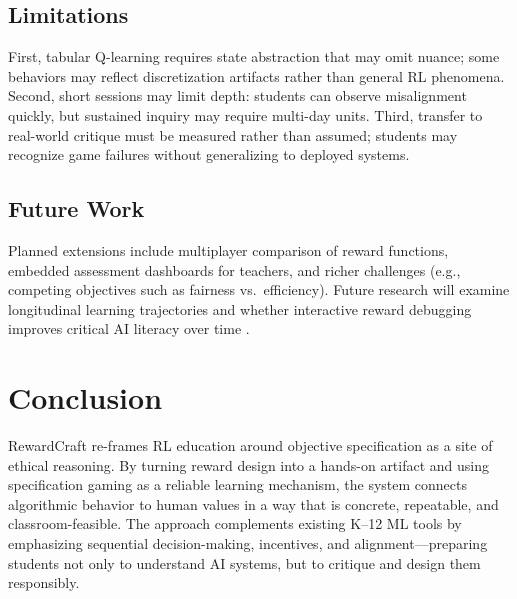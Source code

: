 \documentclass[conference]{IEEEtran}
\begin{document}
\subsection{Limitations}
First, tabular Q-learning requires state abstraction that may omit nuance; some behaviors may reflect discretization artifacts rather than general RL phenomena. Second, short sessions may limit depth: students can observe misalignment quickly, but sustained inquiry may require multi-day units. Third, transfer to real-world critique must be measured rather than assumed; students may recognize game failures without generalizing to deployed systems.

\subsection{Future Work}
Planned extensions include multiplayer comparison of reward functions, embedded assessment dashboards for teachers, and richer challenges (e.g., competing objectives such as fairness vs.\ efficiency). Future research will examine longitudinal learning trajectories and whether interactive reward debugging improves critical AI literacy over time \cite{sanusi2023}.

\section{Conclusion}
RewardCraft re-frames RL education around objective specification as a site of ethical reasoning. By turning reward design into a hands-on artifact and using specification gaming as a reliable learning mechanism, the system connects algorithmic behavior to human values in a way that is concrete, repeatable, and classroom-feasible. The approach complements existing K--12 ML tools by emphasizing sequential decision-making, incentives, and alignment---preparing students not only to understand AI systems, but to critique and design them responsibly.
\end{document}
